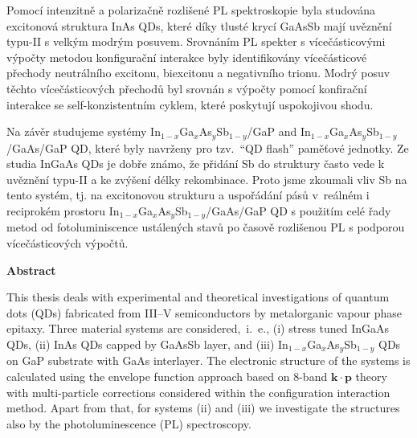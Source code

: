 \documentclass[
a4paper, %
11pt, %
onecolumn, %
openany, %
oldfontcommands,
]{memoir}
\begin{document}


Pomocí intenzitně a polarizačně rozlišené PL spektroskopie byla studována excitonová struktura InAs QDs, které díky tlusté krycí GaAsSb mají uvěznění typu-II s velkým modrým posuvem. Srovnáním PL spekter s vícečásticovými výpočty metodou konfigurační interakce byly identifikovány vícečásticové přechody neutrálního excitonu, biexcitonu a negativního trionu. Modrý posuv těchto vícečásticových přechodů byl srovnán s výpočty pomocí konfirační interakce se self-konzistentním cyklem, které poskytují uspokojivou shodu.


Na závěr studujeme systémy In$_{1-x}$Ga$_x$As$_y$Sb$_{1-y}$/GaP and In$_{1-x}$Ga$_x$As$_y$Sb$_{1-y}$/GaAs/GaP QD, které byly navrženy pro tzv.~\enquote{QD flash} paměťové jednotky. Ze studia InGaAs QDs je dobře známo, že přidání Sb do struktury často vede k uvěznění typu-II a ke zvýšení délky rekombinace. Proto jsme zkoumali vliv Sb na tento systém, tj. na excitonovou strukturu a uspořádání pásů v~reálném i reciprokém prostoru In$ _ {1-x}$Ga$ _x $As$ _y $Sb$ _ {1-y} $/GaAs/GaP QD s použitím celé řady metod od fotoluminiscence ustálených stavů po časově rozlišenou PL s podporou vícečásticových výpočtů.




\vspace{3cm}
\vfill

\cleardoublepage
\noindent\Large\textbf{Abstract}\\ \normalsize

\noindent This thesis deals with experimental and theoretical investigations of quantum dots (QDs) fabricated from III--V semiconductors by metalorganic vapour phase epitaxy. Three material systems are considered,~i.~e., (i) stress tuned InGaAs QDs, (ii) InAs QDs capped by GaAsSb layer, and (iii) In$_{1-x}$Ga$_x$As$_y$Sb$_{1-y}$ QDs on GaP substrate with GaAs interlayer. 
The electronic structure of the systems is calculated using the envelope function approach based on 8-band $\mathbf{k\cdot p}$ theory with multi-particle corrections considered within the configuration interaction method. Apart from that, for systems (ii) and (iii) we investigate the structures also by the photoluminescence (PL) spectroscopy.
\end{document}
